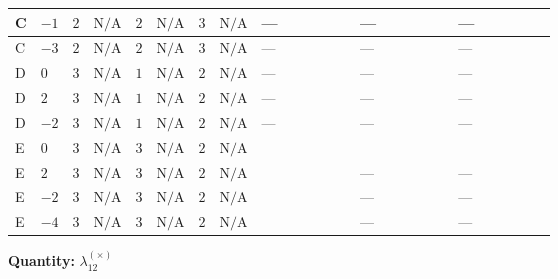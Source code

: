 \documentclass[8pt]{article}
\begin{document}
\begin{landscape}
\begin{longtable}{@{}llcccccc >{\raggedright\arraybackslash}p{0.21\linewidth} >{\raggedright\arraybackslash}p{0.21\linewidth} >{\raggedright\arraybackslash}p{0.21\linewidth}@{}}
\midrule
C & $-1$ & $2$ & $\text{N/A}$ & $2$ & $\text{N/A}$ & $3$ & $\text{N/A}$ & --- & --- & --- \\
\midrule
C & $-3$ & $2$ & $\text{N/A}$ & $2$ & $\text{N/A}$ & $3$ & $\text{N/A}$ & --- & --- & --- \\
\midrule
D & $0$ & $3$ & $\text{N/A}$ & $1$ & $\text{N/A}$ & $2$ & $\text{N/A}$ & --- & --- & --- \\
\midrule
D & $2$ & $3$ & $\text{N/A}$ & $1$ & $\text{N/A}$ & $2$ & $\text{N/A}$ & --- & --- & --- \\
\midrule
D & $-2$ & $3$ & $\text{N/A}$ & $1$ & $\text{N/A}$ & $2$ & $\text{N/A}$ & --- & --- & --- \\
\midrule
E & $0$ & $3$ & $\text{N/A}$ & $3$ & $\text{N/A}$ & $2$ & $\text{N/A}$ & \scriptsize\adjustbox{max width=\linewidth}{$\begin{gathered} -{\lambda_5} \left({\lambda_5}\right)^{*}\end{gathered}$} & \scriptsize\adjustbox{max width=\linewidth}{$\begin{gathered} +{\lambda_{X_{5}}^{(2)}} (8 \left({\lambda_{X_{5}}^{(1)}}\right)^{*}+10 \left({\lambda_{X_{5}}^{(2)}}\right)^{*}+4 \left({\lambda_{X_{9}}}\right)^{*})\end{gathered}$} & \scriptsize\adjustbox{max width=\linewidth}{$\begin{gathered} +8 {\lambda_{X_{5}}^{(1)}} \left({\lambda_{X_{5}}^{(2)}}\right)^{*}\end{gathered}$} \\
\midrule
E & $2$ & $3$ & $\text{N/A}$ & $3$ & $\text{N/A}$ & $2$ & $\text{N/A}$ & \scriptsize\adjustbox{max width=\linewidth}{$\begin{gathered} -{\lambda_5} \left({\lambda_5}\right)^{*}\end{gathered}$} & --- & --- \\
\midrule
E & $-2$ & $3$ & $\text{N/A}$ & $3$ & $\text{N/A}$ & $2$ & $\text{N/A}$ & \scriptsize\adjustbox{max width=\linewidth}{$\begin{gathered} -{\lambda_5} \left({\lambda_5}\right)^{*}\end{gathered}$} & --- & --- \\
\midrule
E & $-4$ & $3$ & $\text{N/A}$ & $3$ & $\text{N/A}$ & $2$ & $\text{N/A}$ & \scriptsize\adjustbox{max width=\linewidth}{$\begin{gathered} -{\lambda_5} \left({\lambda_5}\right)^{*}\end{gathered}$} & --- & --- \\
\midrule
\bottomrule
\end{longtable}
\clearpage
\noindent\textbf{Quantity: }$\lambda_{12}^{(\times)}$\par\smallskip

\end{landscape}
\end{document}
